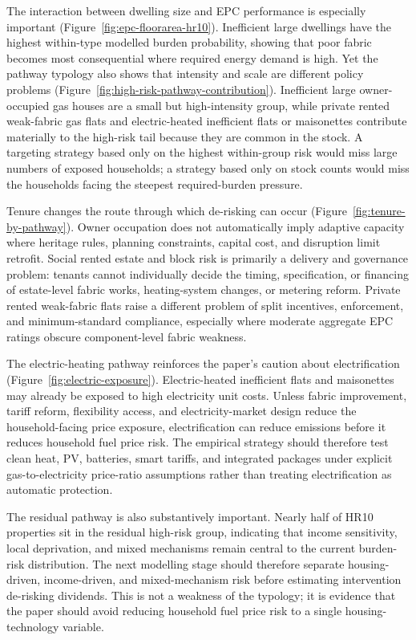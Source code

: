 The interaction between dwelling size and EPC performance is especially important (Figure~\ref{fig:epc-floorarea-hr10}). Inefficient large dwellings have the highest within-type modelled burden probability, showing that poor fabric becomes most consequential where required energy demand is high. Yet the pathway typology also shows that intensity and scale are different policy problems (Figure~\ref{fig:high-risk-pathway-contribution}). Inefficient large owner-occupied gas houses are a small but high-intensity group, while private rented weak-fabric gas flats and electric-heated inefficient flats or maisonettes contribute materially to the high-risk tail because they are common in the stock. A targeting strategy based only on the highest within-group risk would miss large numbers of exposed households; a strategy based only on stock counts would miss the households facing the steepest required-burden pressure.

Tenure changes the route through which de-risking can occur (Figure~\ref{fig:tenure-by-pathway}). Owner occupation does not automatically imply adaptive capacity where heritage rules, planning constraints, capital cost, and disruption limit retrofit. Social rented estate and block risk is primarily a delivery and governance problem: tenants cannot individually decide the timing, specification, or financing of estate-level fabric works, heating-system changes, or metering reform. Private rented weak-fabric flats raise a different problem of split incentives, enforcement, and minimum-standard compliance, especially where moderate aggregate EPC ratings obscure component-level fabric weakness.

The electric-heating pathway reinforces the paper's caution about electrification (Figure~\ref{fig:electric-exposure}). Electric-heated inefficient flats and maisonettes may already be exposed to high electricity unit costs. Unless fabric improvement, tariff reform, flexibility access, and electricity-market design reduce the household-facing price exposure, electrification can reduce emissions before it reduces household fuel price risk. The empirical strategy should therefore test clean heat, PV, batteries, smart tariffs, and integrated packages under explicit gas-to-electricity price-ratio assumptions rather than treating electrification as automatic protection.

The residual pathway is also substantively important. Nearly half of HR10 properties sit in the residual high-risk group, indicating that income sensitivity, local deprivation, and mixed mechanisms remain central to the current burden-risk distribution. The next modelling stage should therefore separate housing-driven, income-driven, and mixed-mechanism risk before estimating intervention de-risking dividends. This is not a weakness of the typology; it is evidence that the paper should avoid reducing household fuel price risk to a single housing-technology variable.

